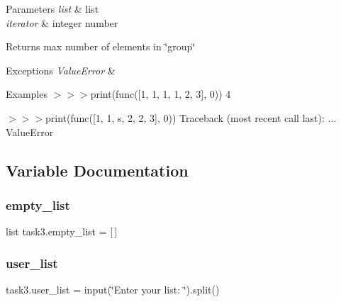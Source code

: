 \begin{DoxyParams}{Parameters}
{\em list} & list \\
\hline
{\em iterator} & integer number \\
\hline
\end{DoxyParams}
\begin{DoxyReturn}{Returns}
max number of elements in \char`\"{}group\char`\"{}
\end{DoxyReturn}

\begin{DoxyExceptions}{Exceptions}
{\em Value\+Error} & \\
\hline
\end{DoxyExceptions}
\begin{DoxyParagraph}{Examples}
$>$$>$$>$print(func(\mbox{[}1, 1, 1, 1, 2, 3\mbox{]}, 0)) 4 
\end{DoxyParagraph}
\begin{DoxyParagraph}{}
$>$$>$$>$print(func(\mbox{[}1, 1, s, 2, 2, 3\mbox{]}, 0)) Traceback (most recent call last)\+: ... Value\+Error 
\end{DoxyParagraph}


\subsection{Variable Documentation}
\mbox{\label{namespacetask3_a89faa84f1abc229e0f6778a23d9a5fd6}} 
\subsubsection{\texorpdfstring{empty\+\_\+list}{empty\_list}}
{\footnotesize\ttfamily list task3.\+empty\+\_\+list = \mbox{[}$\,$\mbox{]}}

\mbox{\label{namespacetask3_a2c1df90f76670ac3e78d4d3a9c7aa92a}} 
\subsubsection{\texorpdfstring{user\+\_\+list}{user\_list}}
{\footnotesize\ttfamily task3.\+user\+\_\+list = input(\char`\"{}Enter your list\+: \char`\"{}).split()}

